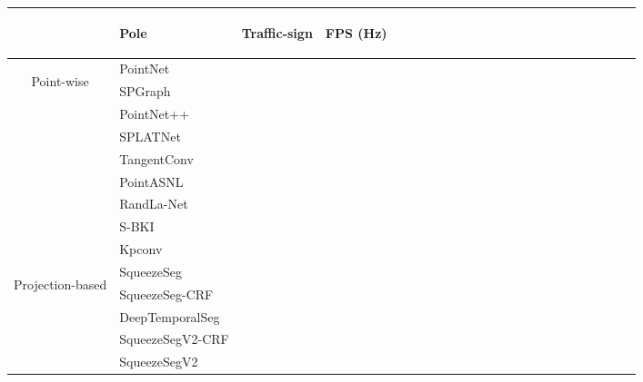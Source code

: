 \documentclass{article}
\begin{document}
\begin{table*}[h]
{\begin{tabular}{c|l|ccccccccccccccccccccc}
& \begin{sideways} Pole \end{sideways} 
& \begin{sideways} Traffic-sign \end{sideways} 
& \begin{sideways} FPS (Hz) \end{sideways}  \\
\hline
\multirow{9}{*}{\begin{sideways} Point-wise  \end{sideways} }
& PointNet \cite{qi2017pointnet} & & & & & & & & & & & & & & & & & & & &  &  \\
& SPGraph \cite{landrieu2018large} & & & & & & & & & & & & & & & & & & & &  &  \\
& PointNet++ \cite{qi2017pointnet++} & & & & & & & & & & & & & & & & & & & &  &  \\
& SPLATNet\cite{Su_2018_CVPR} & & & & & & & & & & & & & & & & & & & &  &  \\
& TangentConv  \cite{tatarchenko2018tangent}& & & & & & & & & & & & & & & & & & & &  &  \\
& PointASNL \cite{yan2020pointasnl} &  &  &  &  &  &  &  &  &  &  &  &  &  &  &  &  &  &  &  &  & \\
& RandLa-Net \cite{hu2019randla} &  &  &  &  &  &  &  &  &  &  &  &  &  &  &  &  &  &  &  &   &  \\
& S-BKI \cite{Gan_2020} &  &  &  &  &  &  &  &  &  &  &  &  &  &  &  &  &  &  &  &   & \\
& Kpconv \cite{thomas2019kpconv} &  &  &  &  &  &  &  &  &  &  &  &  &  &  &  &  &  &  &  &  &  \\
\hline
\multirow{13}{*}{\begin{sideways} Projection-based  \end{sideways} }
& SqueezeSeg \cite{wu2018squeezeseg} &  &  &  &  &  &  &  &  &  &  &  &  &  &  &  &  &  &  &  &   & \\
& SqueezeSeg-CRF \cite{wu2018squeezeseg} &  &  &  &  &  &  &  &  &  &  &  &  &  &  &  &  &  &  &  &   &  \\
& DeepTemporalSeg \cite{dewan2019deeptemporalseg} &  &  &  &  &  &  &  &  &  &  &  &  &  &  &  &  &  &  &  &  &  \\
& SqueezeSegV2-CRF  \cite{wu2019squeezesegv2} &  &  &  &  &  &  &  &  &  &  &  &  &  &  &  &  &  &  &  &   & \\
& SqueezeSegV2 \cite{wu2019squeezesegv2} &  &  &  &  &  &  &  &  &  &  &  &  &  &  &  &  &  &  &  &  & \\

\end{tabular}}
\end{table*}
\end{document}
